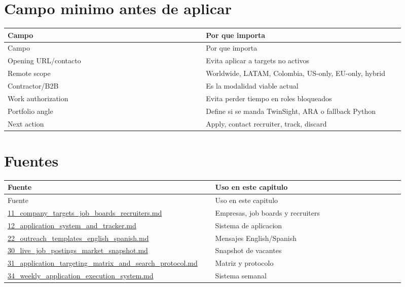 \section{Campo minimo antes de aplicar}


\begin{center}
\scriptsize
\begin{longtable}{>{\raggedright\arraybackslash}p{0.455\linewidth} >{\raggedright\arraybackslash}p{0.455\linewidth}}
\toprule
Campo & Por que importa \\
\midrule
\endfirsthead
\toprule
Campo & Por que importa \\
\midrule
\endhead
Opening URL/contacto & Evita aplicar a targets no activos \\
Remote scope & Worldwide, LATAM, Colombia, US-only, EU-only, hybrid \\
Contractor/B2B & Es la modalidad viable actual \\
Work authorization & Evita perder tiempo en roles bloqueados \\
Portfolio angle & Define si se manda TwinSight, ARA o fallback Python \\
Next action & Apply, contact recruiter, track, discard \\
\bottomrule
\end{longtable}
\end{center}


\section{Fuentes}


\begin{center}
\scriptsize
\begin{longtable}{>{\raggedright\arraybackslash}p{0.455\linewidth} >{\raggedright\arraybackslash}p{0.455\linewidth}}
\toprule
Fuente & Uso en este capitulo \\
\midrule
\endfirsthead
\toprule
Fuente & Uso en este capitulo \\
\midrule
\endhead
\href{file:///E:/Laboral/11_company_targets_job_boards_recruiters.md}{11\_company\_targets\_job\_boards\_recruiters.md} & Empresas, job boards y recruiters \\
\href{file:///E:/Laboral/12_application_system_and_tracker.md}{12\_application\_system\_and\_tracker.md} & Sistema de aplicacion \\
\href{file:///E:/Laboral/22_outreach_templates_english_spanish.md}{22\_outreach\_templates\_english\_spanish.md} & Mensajes English/Spanish \\
\href{file:///E:/Laboral/30_live_job_postings_market_snapshot.md}{30\_live\_job\_postings\_market\_snapshot.md} & Snapshot de vacantes \\
\href{file:///E:/Laboral/31_application_targeting_matrix_and_search_protocol.md}{31\_application\_targeting\_matrix\_and\_search\_protocol.md} & Matriz y protocolo \\
\href{file:///E:/Laboral/34_weekly_application_execution_system.md}{34\_weekly\_application\_execution\_system.md} & Sistema semanal \\
\bottomrule
\end{longtable}
\end{center}


